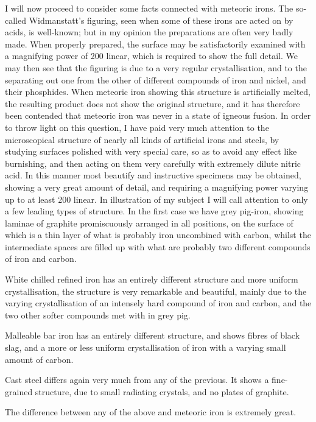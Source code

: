 \documentclass[a4paper, 12pt, oneside]{article}
\begin{document}
I will now proceed to consider some facts connected with meteoric irons. The so-called Widmanstatt's figuring, seen when some of these irons are acted on by acids, is well-known; but in my opinion the preparations are often very badly made. When properly prepared, the surface may be satisfactorily examined with a magnifying power of 200 linear, which is required to show the full detail. We may then see that the figuring is due to a very regular crystallisation, and to the separating out one from the other of different compounds of iron and nickel, and their phosphides. When meteoric iron showing this structure is artificially melted, the resulting product does not show the original structure, and it has therefore been contended that meteoric iron was never in a state of igneous fusion. In order to throw light on this question, I have paid very much attention to the microscopical structure of nearly all kinds of artificial irons and steels, by studying surfaces polished with very special care, so as to avoid any effect like burnishing, and then acting on them very carefully with extremely dilute nitric acid. In this manner most beautify and instructive specimens may be obtained, showing a very great amount of detail, and requiring a magnifying power varying up to at least 200 linear. In illustration of my subject I will call attention to only a few leading types of structure. In the first case we have grey pig-iron, showing laminae of graphite promiscuously arranged in all positions, on the surface of which is a thin layer of what is probably iron uncombined with carbon, whilst the intermediate spaces are filled up with what are probably two different compounds of iron and carbon.

White chilled refined iron has an entirely different structure and more uniform crystallisation, the structure is very remarkable and beautiful, mainly due to the varying crystallisation of an intensely hard compound of iron and carbon, and the two other softer compounds met with in grey pig.

Malleable bar iron has an entirely different structure, and shows fibres of black slag, and a more or less uniform crystallisation of iron with a varying small amount of carbon.

Cast steel differs again very much from any of the previous. It shows a fine-grained structure, due to small radiating crystals, and no plates of graphite.

The difference between any of the above and meteoric iron is extremely great.
\end{document}
